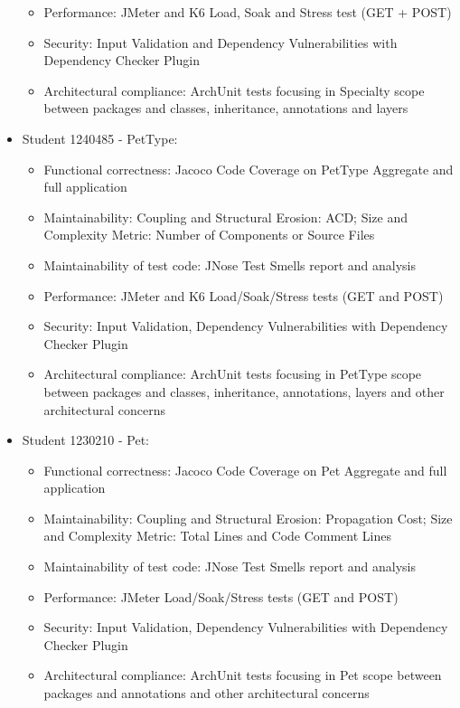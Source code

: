 \documentclass[a4paper,11pt,openright,BCOR=15mm]{scrbook}
\begin{document}
\begin{itemize}
\begin{itemize}
				\item Performance: JMeter and K6 Load, Soak and Stress test (GET + POST)
				\item Security: Input Validation and Dependency Vulnerabilities with Dependency Checker Plugin
				\item Architectural compliance: ArchUnit tests focusing in Specialty scope between packages and classes, inheritance, annotations and layers
			\end{itemize}
			\item Student 1240485 - PetType:
			\begin{itemize}
				\item Functional correctness: Jacoco Code Coverage on PetType Aggregate and full application
				\item Maintainability: Coupling and Structural Erosion: ACD; Size and Complexity Metric: Number of Components or Source Files
				\item Maintainability of test code: JNose Test Smells report and analysis
				\item Performance: JMeter and K6 Load/Soak/Stress tests (GET and POST)
				\item Security: Input Validation, Dependency Vulnerabilities with Dependency Checker Plugin
				\item Architectural compliance: ArchUnit tests focusing in PetType scope between packages and classes, inheritance, annotations, layers and other architectural concerns
			\end{itemize}	
			\item Student 1230210 - Pet:
			\begin{itemize}
				\item Functional correctness: Jacoco Code Coverage on Pet Aggregate and full application
				\item Maintainability: Coupling and Structural Erosion: Propagation Cost; Size and Complexity Metric: Total Lines and Code Comment Lines
				\item Maintainability of test code: JNose Test Smells report and analysis
				\item Performance: JMeter Load/Soak/Stress tests (GET and POST)
				\item Security: Input Validation, Dependency Vulnerabilities with Dependency Checker Plugin
				\item Architectural compliance: ArchUnit tests focusing in Pet scope between packages and annotations and other architectural concerns
			\end{itemize}
		\end{itemize}
		
\end{document}
